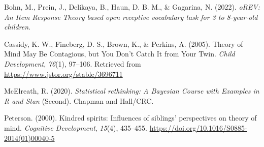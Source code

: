 \documentclass[
  man,floatsintext]{apa6}
\newlength{\cslhangindent}
\newlength{\cslentryspacingunit} %
\newenvironment{CSLReferences}[2] %
 {%
  \setlength{\parindent}{0pt}
  \ifodd #1
  \let\oldpar\par
  \def\par{\hangindent=\cslhangindent\oldpar}
  \fi
  \setlength{\parskip}{#2\cslentryspacingunit}
 }%
 {}
\begin{document}
\hypertarget{refs}{}
\begin{CSLReferences}{1}{0}
\leavevmode{}%
Bohn, M., Prein, J., Delikaya, B., Haun, D. B. M., \& Gagarina, N. (2022). \emph{{oREV}: An {Item Response Theory} based open receptive vocabulary task for 3 to 8-year-old children}.

\leavevmode{}%
Cassidy, K. W., Fineberg, D. S., Brown, K., \& Perkins, A. (2005). Theory of {Mind May Be Contagious}, but {You Don}'t {Catch It} from {Your Twin}. \emph{Child Development}, \emph{76}(1), 97--106. Retrieved from \url{https://www.jstor.org/stable/3696711}

\leavevmode{}%
McElreath, R. (2020). \emph{Statistical rethinking: {A Bayesian Course} with {Examples} in {R} and {Stan}} (Second). {Chapman and Hall/CRC}.

\leavevmode{}%
Peterson. (2000). Kindred spirits: {Influences} of siblings' perspectives on theory of mind. \emph{Cognitive Development}, \emph{15}(4), 435--455. \url{https://doi.org/10.1016/S0885-2014(01)00040-5}

\end{CSLReferences}

\endgroup
\end{document}
